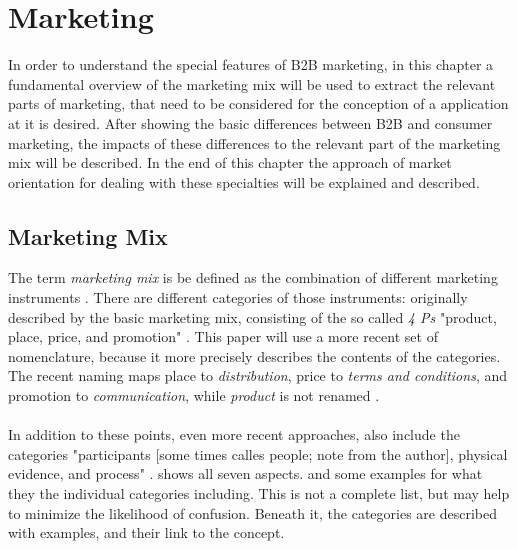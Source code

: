 \section{Marketing}
In order to understand the special features of B2B marketing, in this chapter a fundamental overview of the marketing mix will be used to extract the relevant parts of marketing, that need to be considered for the conception of a application at it is desired. After showing the basic differences between B2B and consumer marketing, the impacts of these differences to the relevant part of the marketing mix will be described. In the end of this chapter the approach of market orientation for dealing with these specialties will be explained and described.
\subsection{Marketing Mix}
The term \textit{marketing mix} is be defined as the combination of different marketing instruments \parencite[cf.][285]{Thommen.2012}. There are  different categories of those instruments: originally described by \textcite[cf.][]{McCarthy.1993} the basic marketing mix, consisting of the so called \textit{4 Ps} "product, place, price, and promotion" . This paper will use a more recent set of nomenclature, because it more precisely describes the contents of the categories. The recent naming maps place to \textit{distribution}, price to \textit{terms and conditions}, and promotion to \textit{communication}, while \textit{product} is not renamed \parencites[285]{Thommen.2012}[cf.][397-720]{Meffert.2015}. 
\paragraph*{} In addition to these points, even more recent approaches, also include the categories "participants [some times calles people; note from the author], physical evidence, and process" \parencite{Rafiq.1995}.  shows all seven aspects.  and some examples for what they the individual categories including. This is not a complete list, but may help to minimize the likelihood of confusion. Beneath it, the categories are described with examples, and their link to the concept.

